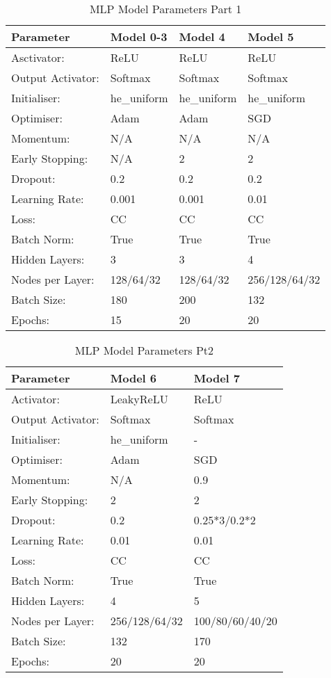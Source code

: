 \medskip
\begin{table}[H]
\centering
\caption{MLP Model Parameters Part 1}
\label{tab:mlp-models-1}
\begin{tabular}{llll}
\hline
Parameter & Model 0-3 & Model 4 & Model 5 \\ \hline
Asctivator: & ReLU & ReLU & ReLU \\
Output Activator: & Softmax & Softmax & Softmax \\
Initialiser: & he\_uniform & he\_uniform & he\_uniform \\
Optimiser: & Adam & Adam & SGD \\
Momentum: & N/A & N/A & N/A \\
Early Stopping: & N/A & 2 & 2 \\
Dropout: & 0.2 & 0.2 & 0.2 \\
Learning Rate: & 0.001 & 0.001 & 0.01 \\
Loss: & CC & CC & CC \\
Batch Norm: & True & True & True \\
Hidden Layers: & 3 & 3 & 4 \\
Nodes per Layer: & 128/64/32 & 128/64/32 & 256/128/64/32 \\
Batch Size: & 180 & 200 & 132 \\
Epochs: & 15 & 20 & 20 \\ \hline
\end{tabular}
\end{table}

\begin{table}[H]
\centering
\caption{MLP Model Parameters Pt2}
\label{tab:mlp-models-2}
\begin{tabular}{lll}
\hline
Parameter         & Model 6       & Model 7         \\ \hline
Activator:        & LeakyReLU     & ReLU            \\
Output Activator: & Softmax       & Softmax         \\
Initialiser:      & he\_uniform   & -               \\
Optimiser:        & Adam          & SGD             \\
Momentum:         & N/A           & 0.9             \\
Early Stopping:   & 2             & 2               \\
Dropout:          & 0.2           & 0.25*3/0.2*2    \\
Learning Rate:    & 0.01          & 0.01            \\
Loss:             & CC            & CC              \\
Batch Norm:       & True          & True            \\
Hidden Layers:    & 4             & 5               \\
Nodes per Layer:  & 256/128/64/32 & 100/80/60/40/20 \\
Batch Size:       & 132           & 170             \\
Epochs:           & 20            & 20              \\ \hline
\end{tabular}
\end{table}

